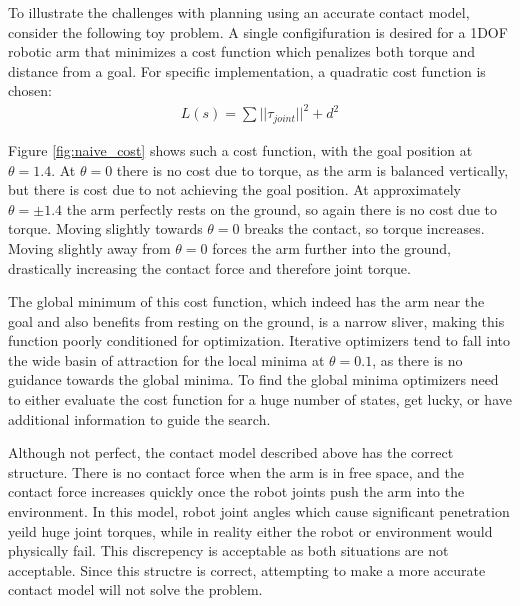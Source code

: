 \documentclass[../thesis.tex]{subfiles}
\begin{document}
To illustrate the challenges with planning using an accurate contact model, consider the following toy problem.
A single configifuration is desired for a 1DOF robotic arm that minimizes a cost function which penalizes both torque and distance from a goal.
For specific implementation, a quadratic cost function is chosen:
\begin{align}
  L(s) = \sum ||\tau_{joint}||^2 + d^2
\end{align}


Figure \ref{fig:naive_cost} shows such a cost function, with the goal position at $\theta=1.4$.
At $\theta=0$ there is no cost due to torque, as the arm is balanced vertically, but there is cost due to not achieving the goal position.
At approximately $\theta= \pm 1.4$ the arm perfectly rests on the ground, so again there is no cost due to torque.
Moving slightly towards $\theta=0$ breaks the contact, so torque increases.
Moving slightly away from $\theta=0$ forces the arm further into the ground, drastically increasing the contact force and therefore joint torque.

The global minimum of this cost function, which indeed has the arm near the goal and also benefits from resting on the ground, is a narrow sliver, making this function poorly conditioned for optimization.
Iterative optimizers tend to fall into the wide basin of attraction for the local minima at $\theta=0.1$, as there is no guidance towards the global minima.
To find the global minima optimizers need to either evaluate the cost function for a huge number of states, get lucky, or have additional information to guide the search.




Although not perfect, the contact model described above has the correct structure.
There is no contact force when the arm is in free space, and the contact force increases quickly once the robot joints push the arm into the environment.
In this model, robot joint angles which cause significant penetration yeild huge joint torques, while in reality either the robot or environment would physically fail.
This discrepency is acceptable as both situations are not acceptable.
Since this structre is correct, attempting to make a more accurate contact model will not solve the problem.
\end{document}
